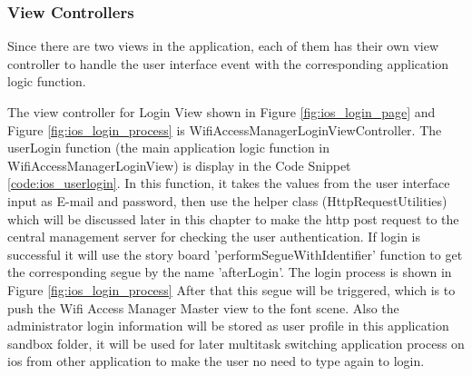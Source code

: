 \subsubsection{View Controllers}
\par Since there are two views in the application, each of them has their own view controller to handle the user interface event with the corresponding application logic function. 
\par The view controller for Login View shown in Figure \ref{fig:ios_login_page} and Figure \ref{fig:ios_login_process} is WifiAccessManagerLoginViewController. The userLogin function (the main application logic function in WifiAccessManagerLoginView) is display in the Code Snippet \ref{code:ios_userlogin}. In this function, it takes the values from the user interface input as E-mail and password, then use the helper class (HttpRequestUtilities) which will be discussed later in this chapter to make the \gls{http} post request to the central management server for checking the user authentication. If login is successful it will use the story board 'performSegueWithIdentifier' function to get the corresponding segue by the name 'afterLogin'. The login process is shown in Figure \ref{fig:ios_login_process} After that this segue will be triggered, which is to push the Wifi Access Manager Master view to the font scene. Also the administrator login information will be stored as user profile in this application sandbox folder, it will be used for later multitask switching application process on \gls{ios} from other application to make the user no need to type again to login.

